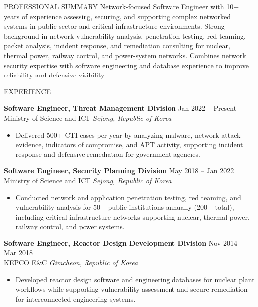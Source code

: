 \documentclass{resume}
\begin{document}
\small

\begin{rSection}{PROFESSIONAL SUMMARY}
Network-focused Software Engineer with 10+ years of experience assessing, securing, and supporting complex networked systems in public-sector and critical-infrastructure environments. Strong background in network vulnerability analysis, penetration testing, red teaming, packet analysis, incident response, and remediation consulting for nuclear, thermal power, railway control, and power-system networks. Combines network security expertise with software engineering and database experience to improve reliability and defensive visibility.
\end{rSection}

\begin{rSection}{EXPERIENCE}

\textbf{Software Engineer, Threat Management Division} \hfill Jan 2022 -- Present\\
Ministry of Science and ICT \hfill \textit{Sejong, Republic of Korea}
\begin{itemize}
    \itemsep -4pt {}
    \item Delivered 500+ CTI cases per year by analyzing malware, network attack evidence, indicators of compromise, and APT activity, supporting incident response and defensive remediation for government agencies.
\end{itemize}

\textbf{Software Engineer, Security Planning Division} \hfill May 2018 -- Jan 2022\\
Ministry of Science and ICT \hfill \textit{Sejong, Republic of Korea}
\begin{itemize}
    \itemsep -4pt {}
    \item Conducted network and application penetration testing, red teaming, and vulnerability analysis for 50+ public institutions annually (200+ total), including critical infrastructure networks supporting nuclear, thermal power, railway control, and power systems.
\end{itemize}

\textbf{Software Engineer, Reactor Design Development Division} \hfill Nov 2014 -- Mar 2018\\
KEPCO E\&C \hfill \textit{Gimcheon, Republic of Korea}
\begin{itemize}
    \itemsep -4pt {}
    \item Developed reactor design software and engineering databases for nuclear plant workflows while supporting vulnerability assessment and secure remediation for interconnected engineering systems.
\end{itemize}

\end{rSection}
\end{document}
